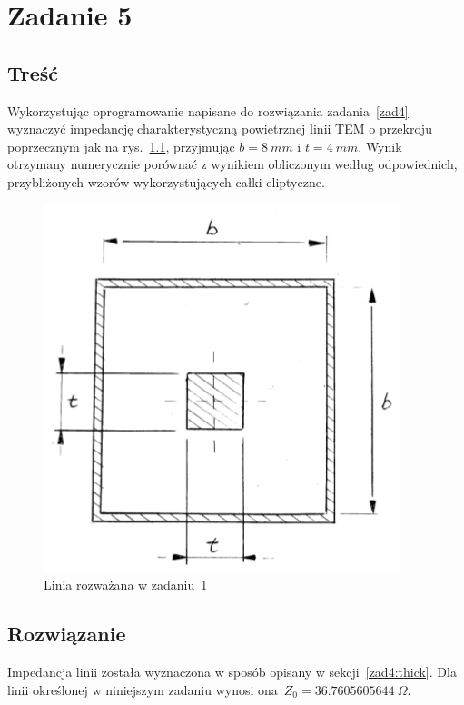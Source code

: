 \documentclass[rep.tex]{subfiles}
\begin{document}
\chapter{Zadanie 5}
\label{zad5}
\section{Treść}
Wykorzystując oprogramowanie napisane do rozwiązania zadania~\ref{zad4} wyznaczyć impedancję charakterystyczną powietrznej linii TEM o przekroju poprzecznym jak na rys.~\ref{fig:zad5:line},
przyjmując $b = 8~mm$ i $t = 4~mm$.
Wynik otrzymany numerycznie porównać z wynikiem obliczonym według odpowiednich,
przybliżonych wzorów wykorzystujących całki eliptyczne.

\begin{figure}[!htbp]
  \centering
  \includegraphics[scale=0.5]{fig/zad5/line}
  \caption{Linia rozważana w zadaniu~\ref{zad5}}
  \label{fig:zad5:line}
\end{figure}

\section{Rozwiązanie}
Impedancja linii została wyznaczona w sposób opisany w sekcji~\ref{zad4:thick}.
Dla linii określonej w niniejszym zadaniu wynosi ona~$Z_0 = 36.7605605644~\Omega$.
\end{document}
